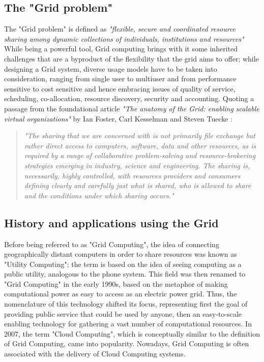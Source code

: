 \subsection{The "Grid problem"}
The "Grid problem" is defined as \textit{"flexible, secure and coordinated resource sharing among dynamic collections of individuals, institutions and resources"} \cite{the_anatomy_of_the_grid}
 While being a powerful tool, Grid computing brings with it some inherited challenges that are a byproduct of the flexibility that the grid aims to offer; while designing a Grid system, diverse usage models have to be taken into consideration, ranging from single user to multiuser and from performance sensitive to cost sensitive and hence embracing issues of quality of service, scheduling, co-allocation, resource discovery, security and accounting.
 Quoting a passage from the foundational article \textit{"The anatomy of the Grid: enabling scalable virtual organizations"} by Ian Foster, Carl Kesselman and Steven Tuecke \cite{the_anatomy_of_the_grid}:
\begin{quotation}
    \textit{"The sharing that we are concerned with is not primarily file exchange but rather direct access to computers, software, data and other resources, as is required by a range of collaborative problem-solving and resource-brokering strategies emerging in industry, science and engineering. The sharing is, necessarily, highly controlled, with resources providers and consumers defining clearly and carefully just what is shared, who is allowed to share and the conditions under which sharing occurs."}
\end{quotation}


\subsection{History and applications using the Grid}
Before being referred to as "Grid Computing", the idea of connecting geographically distant computers in order to share resources was known as "Utility Computing"; the term is based on the idea of seeing computing as a public utility, analogous to the phone system. This field was then renamed to "Grid Computing" in the early 1990s, based on the metaphor of making computational power as easy to access as an electric power grid.
Thus, the nomenclature of this technology shifted its focus, representing first the goal of providing public service that could be used by anyone, then an easy-to-scale enabling technology for gathering a vast number of computational resources. In 2007, the term "Cloud Computing", which is conceptually similar to the definition of Grid Computing, came into popularity. Nowadays, Grid Computing is often associated with the delivery of Cloud Computing systems.
\vspace{5mm}

